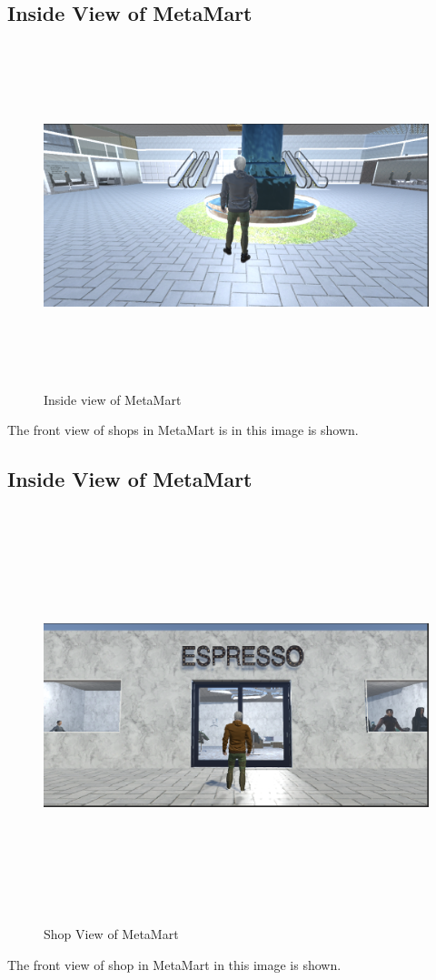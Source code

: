 \subsection{Inside View of MetaMart}
\begin{figure}[H]
    \centering
    \includegraphics[width=12cm,height=10cm]{Figures/Environment/insideview.png}
    \caption{Inside view of MetaMart}
    \label{fig: Entrance of MetaMart}
    
\end{figure}
The front view of shops in MetaMart is in this image is shown.
\subsection{Inside View of MetaMart}
\begin{figure}[H]
    \centering
    \includegraphics[width=13cm,height=12cm]{Figures/Environment/shop.png}
    \caption{Shop View of MetaMart}
    \label{fig:Shop View of MetaMart}
\end{figure}
The front view of shop in MetaMart in this image is shown.
